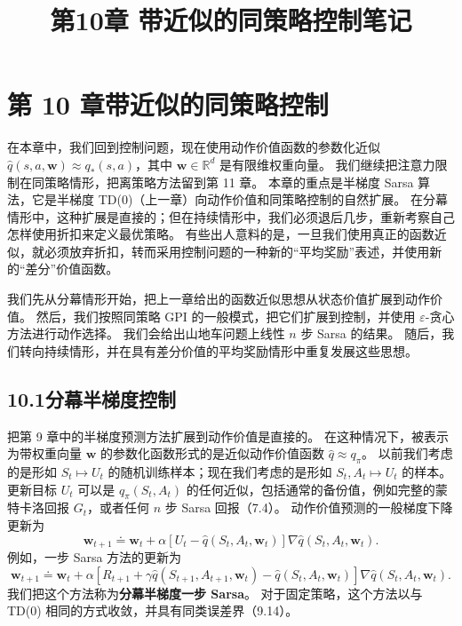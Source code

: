 \documentclass[UTF8,12pt,a4paper,fontset=fandol]{ctexart}
\title{第10章 带近似的同策略控制笔记}
\author{}
\date{}
\begin{document}
\maketitle

\section*{第 10 章\quad 带近似的同策略控制}

在本章中，我们回到控制问题，现在使用动作价值函数的参数化近似
$\hat q(s,a,\mathbf{w})\approx q_*(s,a)$，其中 $\mathbf{w}\in\mathbb{R}^d$ 是有限维权重向量。
我们继续把注意力限制在同策略情形，把离策略方法留到第 11 章。
本章的重点是半梯度 Sarsa 算法，它是半梯度 TD(0)（上一章）向动作价值和同策略控制的自然扩展。
在分幕情形中，这种扩展是直接的；但在持续情形中，我们必须退后几步，重新考察自己怎样使用折扣来定义最优策略。
有些出人意料的是，一旦我们使用真正的函数近似，就必须放弃折扣，转而采用控制问题的一种新的“平均奖励”表述，并使用新的“差分”价值函数。

我们先从分幕情形开始，把上一章给出的函数近似思想从状态价值扩展到动作价值。
然后，我们按照同策略 GPI 的一般模式，把它们扩展到控制，并使用 $\varepsilon$-贪心方法进行动作选择。
我们会给出山地车问题上线性 $n$ 步 Sarsa 的结果。
随后，我们转向持续情形，并在具有差分价值的平均奖励情形中重复发展这些思想。

\subsection*{10.1\quad 分幕半梯度控制}

把第 9 章中的半梯度预测方法扩展到动作价值是直接的。
在这种情况下，被表示为带权重向量 $\mathbf{w}$ 的参数化函数形式的是近似动作价值函数 $\hat q\approx q_\pi$。
以前我们考虑的是形如 $S_t\mapsto U_t$ 的随机训练样本；现在我们考虑的是形如 $S_t,A_t\mapsto U_t$ 的样本。
更新目标 $U_t$ 可以是 $q_\pi(S_t,A_t)$ 的任何近似，包括通常的备份值，例如完整的蒙特卡洛回报 $G_t$，或者任何 $n$ 步 Sarsa 回报（7.4）。
动作价值预测的一般梯度下降更新为
\begin{equation}
\mathbf{w}_{t+1}\doteq \mathbf{w}_t+\alpha\left[U_t-\hat q(S_t,A_t,\mathbf{w}_t)\right]\nabla\hat q(S_t,A_t,\mathbf{w}_t).
\tag{10.1}
\end{equation}
例如，一步 Sarsa 方法的更新为
\begin{equation}
\mathbf{w}_{t+1}\doteq \mathbf{w}_t+\alpha\left[R_{t+1}+\gamma\hat q(S_{t+1},A_{t+1},\mathbf{w}_t)-\hat q(S_t,A_t,\mathbf{w}_t)\right]\nabla\hat q(S_t,A_t,\mathbf{w}_t).
\tag{10.2}
\end{equation}
我们把这个方法称为\textbf{分幕半梯度一步 Sarsa}。
对于固定策略，这个方法以与 TD(0) 相同的方式收敛，并具有同类误差界（9.14）。
\end{document}

